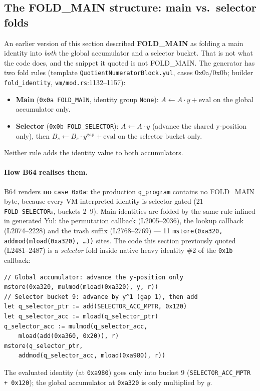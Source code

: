 \subsection{The FOLD\_MAIN structure: main vs.\ selector folds}
\label{sec:pr-foldmain}

 An earlier version of this section described
\textbf{FOLD\_MAIN} as folding a main identity into \emph{both} the
global accumulator and a selector bucket. That is not what the
code does, and the snippet it quoted is not FOLD\_MAIN. The
generator has two fold rules (template
\texttt{QuotientNumeratorBlock.yul}, cases 0x0a/0x0b; builder
\texttt{fold\_identity}, \texttt{vm/mod.rs}:1132--1157):
\begin{itemize}
\item \textbf{Main} (\texttt{0x0a FOLD\_MAIN}, identity group
  \texttt{None}): $A \leftarrow A\cdot y + \text{eval}$ on the
  global accumulator only.
\item \textbf{Selector} (\texttt{0x0b FOLD\_\allowbreak{}SELECTOR}):
  $A \leftarrow A\cdot y$ (advance the shared y-position only),
  then $B_s \leftarrow B_s\cdot y^{\text{gap}} + \text{eval}$ on
  the selector bucket only.
\end{itemize}
Neither rule adds the identity value to both accumulators.

\paragraph{How B64 realises them.} B64 renders \textbf{no}
\texttt{case 0x0a}: the production \texttt{q\_program} contains no
FOLD\_MAIN byte, because every VM-interpreted identity is
selector-gated (21 \texttt{FOLD\_SELECTOR}s, buckets 2--9). Main
identities are folded by the same rule inlined in generated Yul:
the permutation callback (L2005--2036), the lookup callback
(L2074--2228) and the trash suffix (L2768--2769) --- 11
\texttt{mstore(0xa320, addmod(mload(0xa320), \ldots))} sites. The
code this section previously quoted (L2481--2487) is a
\emph{selector} fold inside native heavy identity \#2 of the
\texttt{0x1b} callback:
\begin{lstlisting}[style=yul]
// Global accumulator: advance the y-position only
mstore(0xa320, mulmod(mload(0xa320), y, r))
// Selector bucket 9: advance by y^1 (gap 1), then add
let q_selector_ptr := add(SELECTOR_ACC_MPTR, 0x120)
let q_selector_acc := mload(q_selector_ptr)
q_selector_acc := mulmod(q_selector_acc,
    mload(add(0xa360, 0x20)), r)
mstore(q_selector_ptr,
    addmod(q_selector_acc, mload(0xa980), r))
\end{lstlisting}
The evaluated identity (at \texttt{0xa980}) goes only into bucket
9 (\texttt{SELECTOR\_\allowbreak{}ACC\_\allowbreak{}MPTR + 0x120}); the global accumulator
at \texttt{0xa320} is only multiplied by $y$.

